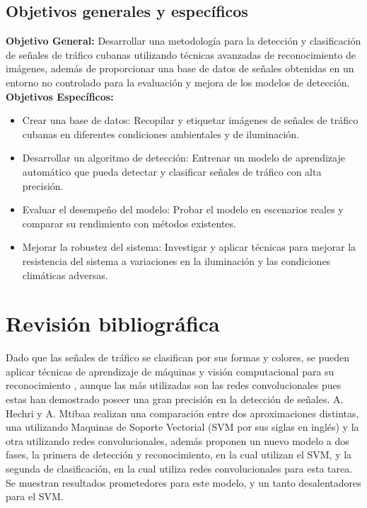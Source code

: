\documentclass{article}
\begin{document}
\subsection{Objetivos generales y específicos}
\textbf{Objetivo General:} Desarrollar una metodología para la detección y clasificación de señales de tráfico cubanas utilizando técnicas avanzadas de reconocimiento de imágenes, además de proporcionar una base de datos de señales obtenidas en un entorno no controlado para la evaluación y mejora de los modelos de detección.
\newpage
\textbf{Objetivos Específicos:}
\begin{itemize}
    \item{Crear una base de datos: Recopilar y etiquetar imágenes de señales de tráfico cubanas en diferentes condiciones ambientales y de iluminación.}
    \item{Desarrollar un algoritmo de detección: Entrenar un modelo de aprendizaje automático que pueda detectar y clasificar señales de tráfico con alta precisión.}
    \item{Evaluar el desempeño del modelo: Probar el modelo en escenarios reales y comparar su rendimiento con métodos existentes.}
    \item{Mejorar la robustez del sistema: Investigar y aplicar técnicas para mejorar la resistencia del sistema a variaciones en la iluminación y las condiciones climáticas adversas.}
\end{itemize}
\newpage




\section{Revisión bibliográfica}
Dado que las señales de tráfico se clasifican por sus formas y colores, se pueden aplicar técnicas de aprendizaje de máquinas y visión computacional para su reconocimiento \cite{ref6}, aunque las más utilizadas son las redes convolucionales pues estas han demostrado poseer una gran precisión en la detección de señales. A. Hechri y A. Mtibaa \cite{ref8} realizan una comparación entre dos aproximaciones distintas, una utilizando Maquinas de Soporte Vectorial (SVM por sus siglas en inglés) y la otra utilizando redes convolucionales, además proponen un nuevo modelo a dos fases, la primera de detección y reconocimiento, en la cual utilizan el SVM, y la segunda de clasificación, en la cual utiliza redes convolucionales para esta tarea. Se muestran resultados prometedores para este modelo, y un tanto desalentadores para el SVM.
\end{document}
